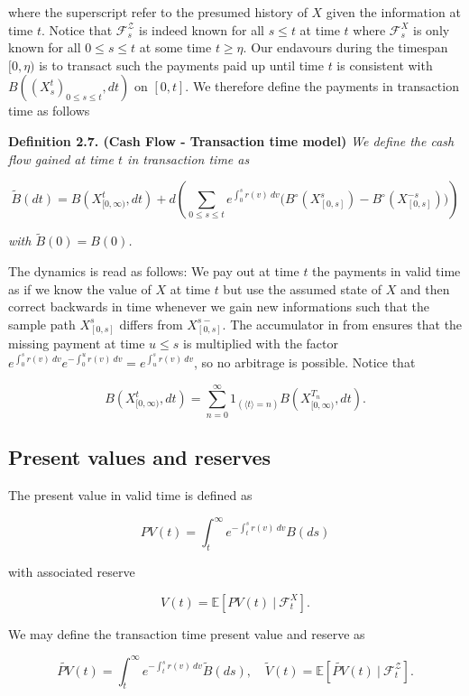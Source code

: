\documentclass[a4paper,10pt,openany]{book}
\begin{document}
where the superscript refer to the presumed history of \(X\) given the information at time \(t\). Notice that \(\mathcal F^{\mathcal Z}_s\) is indeed known for all \(s\le t\) at time \(t\) where \(\mathcal F^X_s\) is only known for all \(0\le s\le t\) at some time \(t\ge \eta\). Our endavours during the timespan \([0,\eta)\) is to transact such the payments paid up until time \(t\) is consistent with \(B((X_s^t)_{0\le s\le t},dt)\) on \([0,t]\). We therefore define the payments in transaction time as follows

\textbf{Definition 2.7. (Cash Flow - Transaction time model)} \emph{We define the cash flow gained at time \(t\) in transaction time as}

\[
\tilde B(dt)= B(X^t_{[0,\infty)},dt)+d\left(\sum_{0\le s\le t}e^{\int_0^sr(v)\ dv}\Big(B^\circ(X^s_{[0,s]})-B^\circ(X^{-s}_{[0,s]})\Big)\right)
\]

\emph{with \(\tilde B(0)=B(0)\).}

The dynamics is read as follows: We pay out at time \(t\) the payments in valid time as if we know the value of \(X\) at time \(t\) but use the assumed state of \(X\) and then correct backwards in time whenever we gain new informations such that the sample path \(X^{s}_{[0,s]}\) differs from \(X^{s-}_{[0,s]}\). The accumulator in from ensures that the missing payment at time \(u\le s\) is multiplied with the factor \(e^{\int_0^sr(v)\ dv}e^{-\int_0^u r(v)\ dv}= e^{\int_u^sr(v)\ dv}\), so no arbitrage is possible. Notice that

\[
B(X^t_{[0,\infty)},dt)=\sum_{n=0}^\infty 1_{(\langle t\rangle=n)}B(X^{T_n}_{[0,\infty)},dt).
\]

\hypertarget{present-values-and-reserves}{%
\subsection{Present values and reserves}\label{present-values-and-reserves}}

The present value in valid time is defined as

\[
PV(t)=\int_t^\infty e^{-\int_t^s r(v)\ dv}B(ds)
\]

with associated reserve

\[
V(t)=\mathbb E\left[PV(t)\ \vert\ \mathcal F^X_t\right].
\]

We may define the transaction time present value and reserve as

\[
\tilde{PV}(t)=\int_t^\infty e^{-\int_t^s r(v)\ dv}\tilde B(ds),\quad \tilde V(t)=\mathbb E\left[\tilde {PV}(t)\ \vert\ \mathcal F^{\mathcal Z}_t\right].
\]
\end{document}
